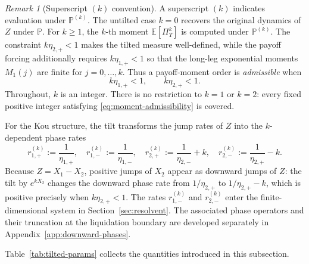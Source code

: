 \documentclass[11pt]{article}
\newcommand{\E}{\mathbb{E}}
\renewcommand{\P}{\mathbb{P}}
\theoremstyle{plain}
\theoremstyle{definition}
\theoremstyle{remark}
\newtheorem{remark}{Remark}
\begin{document}
\begin{remark}[Superscript $(k)$ convention]\label{rem:k-notation}
A superscript $(k)$ indicates evaluation under $\P^{(k)}$. The untilted case $k=0$ recovers the
original dynamics of $Z$ under $\P$. For $k\ge 1$, the $k$-th moment $\E[\Pi_T^k]$ is computed
under $\P^{(k)}$. The constraint $k\eta_{2,+}<1$ makes the tilted measure well-defined, while
the payoff forcing additionally requires $k\eta_{1,+}<1$ so that the long-leg exponential
moments $M_1(j)$ are finite for $j=0,\ldots,k$. Thus a payoff-moment order is
\emph{admissible} when
\begin{equation}\label{eq:moment-admissibility}
k\eta_{1,+}<1,
\qquad
k\eta_{2,+}<1.
\end{equation}
Throughout, $k$ is an integer. There is no restriction to $k=1$ or $k=2$: every fixed
positive integer satisfying \eqref{eq:moment-admissibility} is covered.
\end{remark}

For the Kou structure, the tilt transforms the jump rates of $Z$ into the $k$-dependent phase rates
\[
r_{1,+}^{(k)}:=\frac{1}{\eta_{1,+}},
\quad
r_{1,-}^{(k)}:=\frac{1}{\eta_{1,-}},
\quad
r_{2,+}^{(k)}:=\frac{1}{\eta_{2,-}}+k,
\quad
r_{2,-}^{(k)}:=\frac{1}{\eta_{2,+}}-k.
\]
Because $Z=X_1-X_2$, positive jumps of $X_2$ appear as downward jumps of $Z$: the tilt by $e^{kX_2}$
changes the downward phase rate from $1/\eta_{2,+}$ to $1/\eta_{2,+}-k$, which is positive precisely
when $k\eta_{2,+}<1$.
The rates $r_{1,-}^{(k)}$ and $r_{2,-}^{(k)}$ enter the finite-dimensional system in
Section~\ref{sec:resolvent}. The associated phase operators and their truncation at the
liquidation boundary are developed separately in Appendix~\ref{app:downward-phases}.

Table~\ref{tab:tilted-params} collects the quantities introduced in this subsection.
\end{document}
